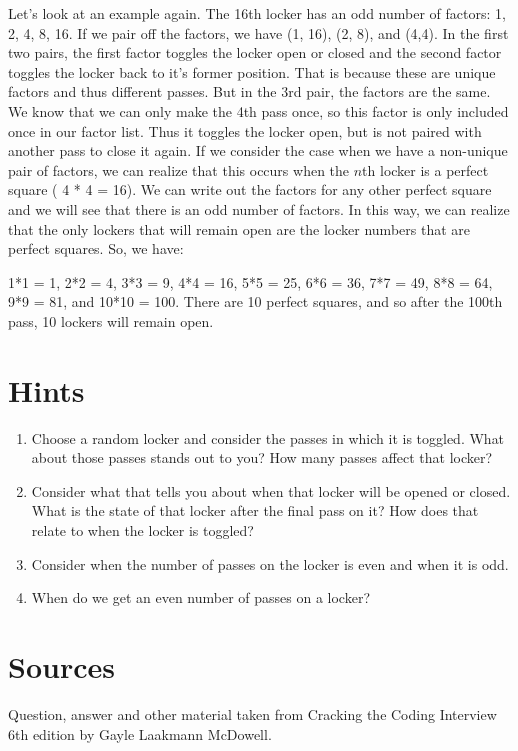 \documentclass{article}
\begin{document}
Let's look at an example again. The 16th locker has an odd number of factors: 1, 2, 4, 8, 16. If we pair off the factors, we have (1, 16), (2, 8), and (4,4). In the first two pairs, the first factor toggles the locker open or closed and the second factor toggles the locker back to it's former position. That is because these are unique factors and thus different passes. But in the 3rd pair, the factors are the same. We know that we can only make the 4th pass once, so this factor is only included once in our factor list. Thus it toggles the locker open, but is not paired with another pass to close it again. If we consider the case when we have a non-unique pair of factors, we can realize that this occurs when the $n$th locker is a perfect square ( 4 * 4 = 16). We can write out the factors for any other perfect square and we will see that there is an odd number of factors. In this way, we can realize that the only lockers that will remain open are the locker numbers that are perfect squares. So, we have:

1*1 = 1, 2*2 = 4, 3*3 = 9, 4*4 = 16, 5*5 = 25, 6*6 = 36, 7*7 = 49, 8*8 = 64, 9*9 = 81, and 10*10 = 100. There are 10 perfect squares, and so after the 100th pass, 10 lockers will remain open.

\section*{Hints}
 

\begin{enumerate}
	\item Choose a random locker and consider the passes in which it is toggled. What about those passes stands out to you? How many passes affect that locker? 

	\item Consider what that tells you about when that locker will be opened or closed. What is the state of that locker after the final pass on it? How does that relate to when the locker is toggled?

	\item  Consider when the number of passes on the locker is even and when it is odd.

	\item When do we get an even number of passes on a locker?

\end{enumerate} 

\section*{Sources}

Question, answer and other material taken from Cracking the Coding Interview 6th edition by Gayle Laakmann McDowell.
\end{document}
